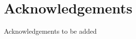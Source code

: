 \chapter*{Acknowledgements}
Acknowledgements to be added

\setcounter{tocdepth}{2}

\tableofcontents

\newpage

